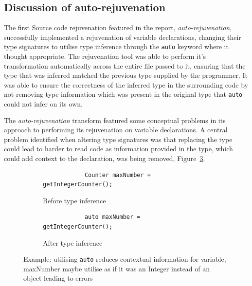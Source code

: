 \documentclass[bsc,frontabs,singlespacing,twoside,parskip,deptreport]{infthesis}
\begin{document}
\subsection{Discussion of auto-rejuvenation}

The first Source code rejuvenation featured in the report, \textit{auto-rejuvenation}, successfully implemented a rejuvenation of variable declarations, changing their type signatures to utilise type inference through the \texttt{auto} keyword where it thought appropriate. The rejuvenation tool was able to perform it's transformation automatically across the entire file passed to it, ensuring that the type that was inferred matched the previous type supplied by the programmer. It was able to ensure the correctness of the inferred type in the surrounding code by not removing type information which was present in the original type that \texttt{auto} could not infer on its own.

The \textit{auto-rejuvenation} transform featured some conceptual problems in its approach to performing its rejuvenation on variable declarations. A central problem identified when altering type signatures was that replacing the type could lead to harder to read code as information provided in the type, which could add context to the declaration, was being removed, Figure~\ref{fig:reduce-info-auto}. 

\begin{figure}[H]
    \centering
    \begin{subfigure}[h]{\textwidth}
        \centering
        \begin{verbatim}
            Counter maxNumber = getIntegerCounter();
        \end{verbatim}
        \caption{Before type inference}
        \label{fig:type-context-before}
        \vspace{0.40cm}
    \end{subfigure}
    
    \begin{subfigure}[h]{\textwidth}
        \begin{verbatim}
            auto maxNumber = getIntegerCounter();
        \end{verbatim}
        \caption{After type inference }
        \centering
        \label{fig:type-context-after}
    \end{subfigure}

    \caption{Example: utilising \texttt{auto} reduces contextual information for variable, maxNumber maybe utilise as if it was an Integer instead of an object leading to errors}
    \label{fig:reduce-info-auto}
\end{figure}
\end{document}
